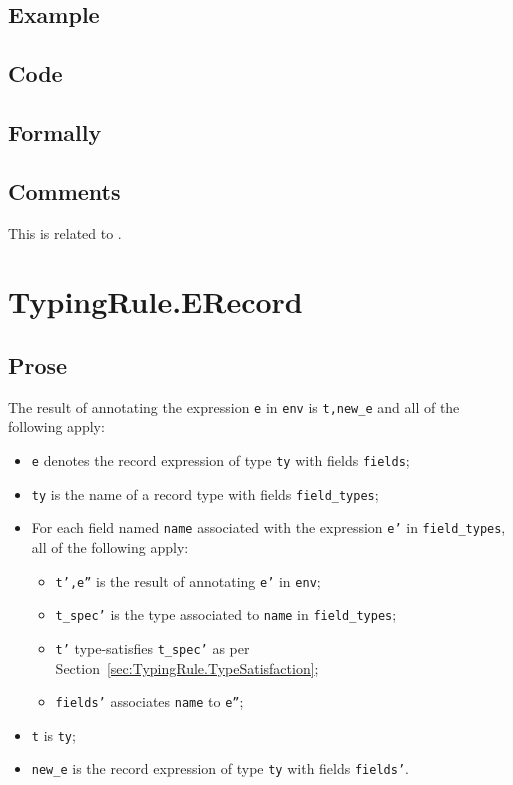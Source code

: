 \documentclass{book}
\begin{document}
  \subsection{Example}

  \subsection{Code}

\begin{emptyformal}
    \subsection{Formally}

\end{emptyformal}

\subsection{Comments}
  This is related to .

\section{TypingRule.ERecord \label{sec:TypingRule.ERecord}}

  \subsection{Prose}
  The result of annotating the expression \texttt{e} in \texttt{env} is
\texttt{t,new\_e} and all of the following apply:
  \begin{itemize}
  \item \texttt{e} denotes the record expression of type \texttt{ty} with fields \texttt{fields};
  \item \texttt{ty} is the name of a record type with fields \texttt{field\_types};
  \item For each field named \texttt{name} associated with the expression \texttt{e'} in
    \texttt{field\_types}, all of the following apply:
    \begin{itemize}
    \item \texttt{t',e''} is the result of annotating \texttt{e'} in \texttt{env};
    \item \texttt{t\_spec'} is the type associated to \texttt{name} in \texttt{field\_types};
    \item \texttt{t'} type-satisfies \texttt{t\_spec'} as per Section~\ref{sec:TypingRule.TypeSatisfaction};
    \item \texttt{fields'} associates \texttt{name} to \texttt{e''};
    \end{itemize}
  \item \texttt{t} is \texttt{ty};
  \item \texttt{new\_e} is the record expression of type \texttt{ty} with fields \texttt{fields'}.
  \end{itemize}
\end{document}
